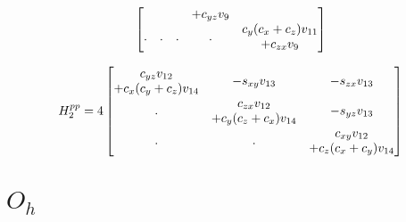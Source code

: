 \documentclass[twocolumn,showpacs,preprintnumbers,superscriptaddress,prb,floatfix,aps,10pt]{revtex4-1}
\begin{document}
\begin{widetext}
\begin{equation}
\begin{bmatrix}
                                                            &                                                 &                                           &                  +c_{yz} v_{9}           &                                    \\
\multirow{2}{*}{.}                                          & \multirow{2}{*}{.}                              & \multirow{2}{*}{.}                        & \multirow{2}{*}{.}                       &      c_{y} (c_{x}+c_{z}) v_{11}    \\
                                                            &                                                 &                                           &                                          &                  +c_{zx} v_{9}     \\
\end{bmatrix}
\end{equation}
\end{widetext}


\begin{equation}
H^{pp}_2 =  4
\begin{bmatrix}
              c_{yz} v_{12} & \multirow{2}{*}{$-s_{xy} v_{13}$} & \multirow{2}{*}{$-s_{zx} v_{13}$}  \\
+c_{x} (c_{y}+c_{z}) v_{14} &                                   &                                    \\
\multirow{2}{*}{.}          &               c_{zx} v_{12}       & \multirow{2}{*}{$-s_{yz} v_{13}$}  \\
                            & +c_{y} (c_{z}+c_{x}) v_{14}       &                                    \\
\multirow{2}{*}{.}          & \multirow{2}{*}{.}                &          c_{xy} v_{12}             \\ 
                            &                                   &        +c_{z} (c_{x}+c_{y}) v_{14} \\
\end{bmatrix}
\end{equation}






\section{$O_h$}
\label{appendix:pg}
\end{document}
